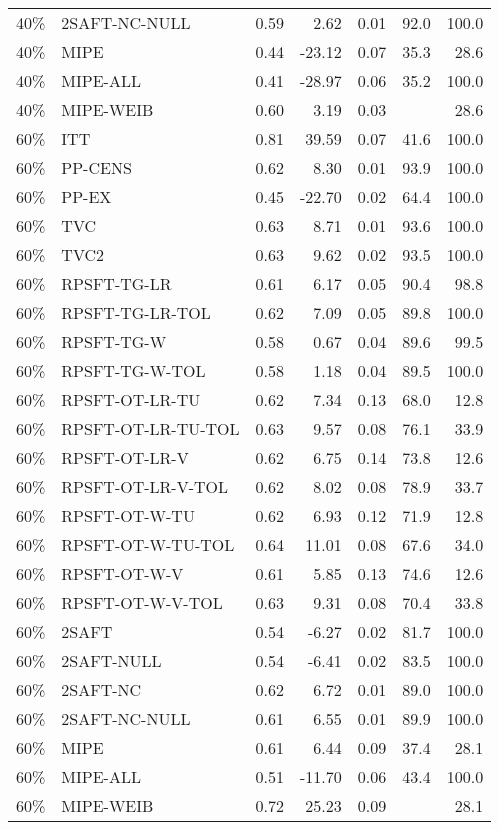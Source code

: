 \begin{table}[ht]
{\begin{tabular}{llrrrrr}
  40\% & 2SAFT-NC-NULL & 0.59 & 2.62 & 0.01 & 92.0 & 100.0 \\ 
  40\% & MIPE & 0.44 & -23.12 & 0.07 & 35.3 & 28.6 \\ 
  40\% & MIPE-ALL & 0.41 & -28.97 & 0.06 & 35.2 & 100.0 \\ 
  40\% & MIPE-WEIB & 0.60 & 3.19 & 0.03 &  & 28.6 \\ 
   \hline
60\% & ITT & 0.81 & 39.59 & 0.07 & 41.6 & 100.0 \\ 
  60\% & PP-CENS & 0.62 & 8.30 & 0.01 & 93.9 & 100.0 \\ 
  60\% & PP-EX & 0.45 & -22.70 & 0.02 & 64.4 & 100.0 \\ 
  60\% & TVC & 0.63 & 8.71 & 0.01 & 93.6 & 100.0 \\ 
  60\% & TVC2 & 0.63 & 9.62 & 0.02 & 93.5 & 100.0 \\ 
   \hline
60\% & RPSFT-TG-LR & 0.61 & 6.17 & 0.05 & 90.4 & 98.8 \\ 
  60\% & RPSFT-TG-LR-TOL & 0.62 & 7.09 & 0.05 & 89.8 & 100.0 \\ 
  60\% & RPSFT-TG-W & 0.58 & 0.67 & 0.04 & 89.6 & 99.5 \\ 
  60\% & RPSFT-TG-W-TOL & 0.58 & 1.18 & 0.04 & 89.5 & 100.0 \\ 
  60\% & RPSFT-OT-LR-TU & 0.62 & 7.34 & 0.13 & 68.0 & 12.8 \\ 
  60\% & RPSFT-OT-LR-TU-TOL & 0.63 & 9.57 & 0.08 & 76.1 & 33.9 \\ 
  60\% & RPSFT-OT-LR-V & 0.62 & 6.75 & 0.14 & 73.8 & 12.6 \\ 
  60\% & RPSFT-OT-LR-V-TOL & 0.62 & 8.02 & 0.08 & 78.9 & 33.7 \\ 
   \hline
60\% & RPSFT-OT-W-TU & 0.62 & 6.93 & 0.12 & 71.9 & 12.8 \\ 
  60\% & RPSFT-OT-W-TU-TOL & 0.64 & 11.01 & 0.08 & 67.6 & 34.0 \\ 
  60\% & RPSFT-OT-W-V & 0.61 & 5.85 & 0.13 & 74.6 & 12.6 \\ 
  60\% & RPSFT-OT-W-V-TOL & 0.63 & 9.31 & 0.08 & 70.4 & 33.8 \\ 
   \hline
60\% & 2SAFT & 0.54 & -6.27 & 0.02 & 81.7 & 100.0 \\ 
  60\% & 2SAFT-NULL & 0.54 & -6.41 & 0.02 & 83.5 & 100.0 \\ 
  60\% & 2SAFT-NC & 0.62 & 6.72 & 0.01 & 89.0 & 100.0 \\ 
  60\% & 2SAFT-NC-NULL & 0.61 & 6.55 & 0.01 & 89.9 & 100.0 \\ 
  60\% & MIPE & 0.61 & 6.44 & 0.09 & 37.4 & 28.1 \\ 
  60\% & MIPE-ALL & 0.51 & -11.70 & 0.06 & 43.4 & 100.0 \\ 
  60\% & MIPE-WEIB & 0.72 & 25.23 & 0.09 &  & 28.1 \\ 
   \hline
\end{tabular}
}
\end{table}
